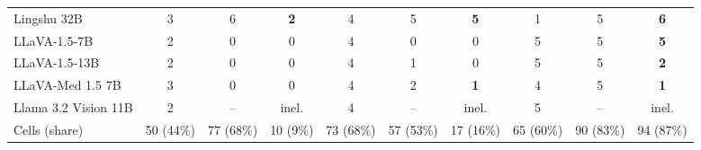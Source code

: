 \begin{table}[t]
\begin{tabular}{lccccccccc}
Lingshu 32B & 3 & 6 & \textbf{2} & 4 & 5 & \textbf{5} & 1 & 5 & \textbf{6} \\
LLaVA-1.5-7B & 2 & 0 & 0 & 4 & 0 & 0 & 5 & 5 & \textbf{5} \\
LLaVA-1.5-13B & 2 & 0 & 0 & 4 & 1 & 0 & 5 & 5 & \textbf{2} \\
LLaVA-Med 1.5 7B & 3 & 0 & 0 & 4 & 2 & \textbf{1} & 4 & 5 & \textbf{1} \\
Llama 3.2 Vision 11B & 2 & -- & inel. & 4 & -- & inel. & 5 & -- & inel. \\
\midrule
Cells (share) & 50 (44\%) & 77 (68\%) & 10 (9\%) & 73 (68\%) & 57 (53\%) & 17 (16\%) & 65 (60\%) & 90 (83\%) & 94 (87\%) \\
\bottomrule
\end{tabular}
\end{table}
